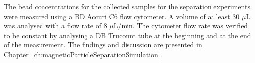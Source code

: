 The bead concentrations for the collected samples for the separation experiments were measured using a BD Accuri C6 flow cytometer. A volume of at least $30$ $\mu$L was analysed with a flow rate of $8$ $\mu$L/min. The cytometer flow rate was verified to be constant by analysing a DB Trucount tube at the beginning and at the end of the measurement. The findings and discussion are presented in Chapter~\ref{ch:magneticParticleSeparationSimulation}.

